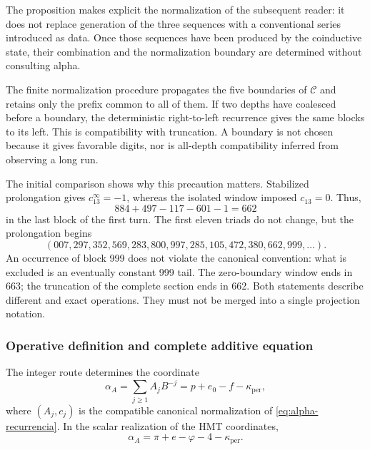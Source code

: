 The proposition makes explicit the normalization of the subsequent reader: it does
not replace generation of the three sequences with a conventional series
introduced as data. Once those sequences have been produced by the coinductive
state, their combination and the normalization boundary are
determined without consulting alpha.

The finite normalization procedure propagates the five
boundaries of \(\mathcal C\) and retains only the prefix common to
all of them. If two depths have coalesced before a boundary,
the deterministic right-to-left recurrence gives the same blocks
to its left. This is compatibility with truncation. A boundary is not
chosen because it gives favorable digits, nor is all-depth
compatibility inferred from observing a long run.

The initial comparison shows why this precaution matters. Stabilized
prolongation gives \(c_{13}^{\infty}=-1\), whereas
the isolated window imposed \(c_{13}=0\). Thus,
\[
 884+497-117-601-1=662
\]
in the last block of the first turn. The first eleven triads do not
change, but the prolongation begins
\[
 (007,297,352,569,283,800,997,285,105,472,380,662,999,\ldots).
\]
An occurrence of block 999 does not violate the canonical convention: what
is excluded is an eventually constant 999 tail. The zero-boundary
window ends in 663; the truncation of the complete section
ends in 662. Both statements describe different and exact
operations. They must not be merged into a single projection notation.

\subsubsection{Operative definition and complete additive equation}
\label{subsec:alpha-definicion}

\begin{definition}
\label{def:alpha-operativa}
The integer route determines the coordinate
\begin{equation}
 \alpha_A=\sum_{j\geq1}A_jB^{-j}
 =p+e_0-f-\kappa_{\mathrm{per}},
 \label{eq:alpha-via-a}
\end{equation}
where \((A_j,c_j)\) is the compatible canonical normalization of
\eqref{eq:alpha-recurrencia}. In the scalar realization of the
HMT coordinates,
\begin{equation}
 \boxed{\alpha_A=
 \pi+e-\varphi
 -4-\kappa_{\mathrm{per}}.}
 \label{eq:alpha-identidad-completa}
\end{equation}
\end{definition}

